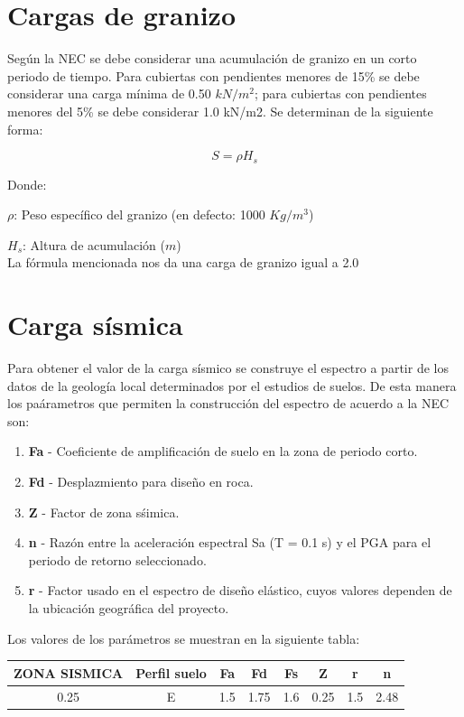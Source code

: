 \documentclass{report}
\begin{document}
\section{Cargas de granizo}
Seg\'un la NEC se debe considerar una acumulaci\'on de granizo en un corto periodo de tiempo.
Para cubiertas con pendientes menores de 15\% se debe considerar una carga m\'inima de 0.50 $kN/m^2$; 
para cubiertas con pendientes menores del 5\% se debe considerar 1.0 kN/m2. Se determinan de la siguiente forma:
    
$$S = \rho H_s$$

Donde:

$\rho $: Peso espec\'ifico del granizo (en defecto: 1000 $Kg/m^3$)

$H_s$: Altura de acumulaci\'on ($m$)
\\
La f\'ormula mencionada nos da una carga de granizo igual a 2.0

\section{Carga s\'ismica}
Para obtener el valor de la carga s\'ismico se construye el espectro a partir de los datos de la geolog\'ia local determinados
por el estudios de suelos.
De esta manera los pa\'arametros que permiten la construcci\'on del espectro de acuerdo a la NEC son:

\begin{enumerate}
    \item[\textbullet] \textbf{Fa} - Coeficiente de amplificaci\'on de suelo en la zona de periodo corto.
    \item[\textbullet] \textbf{Fd} - Desplazmiento para dise\~no en roca.
    \item[\textbullet] \textbf{Z} - Factor de zona s\'simica.
    \item[\textbullet] \textbf{n} - Raz\'on entre la aceleraci\'on espectral Sa (T = 0.1 s) y el PGA para el periodo de retorno seleccionado.
    \item[\textbullet] \textbf{r} - Factor usado en el espectro de dise\~no el\'astico, cuyos valores dependen de la ubicaci\'on geogr\'afica del proyecto.
\end{enumerate}

Los valores de los par\'ametros se muestran en la siguiente tabla:

    \begin{table}[h]
        \centering
            \begin{tabular}{|c|c|c|c|c|c|c|c|}
                \hline
                \textbf{ZONA SISMICA} & \textbf{Perfil suelo} & \textbf{Fa} & \textbf{Fd} & \textbf{Fs} & \textbf{Z} & \textbf{r} & \textbf{n}\\
                \hline
                0.25 & E & 1.5 & 1.75 & 1.6 & 0.25 & 1.5 & 2.48\\
                \hline
            \end{tabular}
    \end{table}
    
\end{document}
